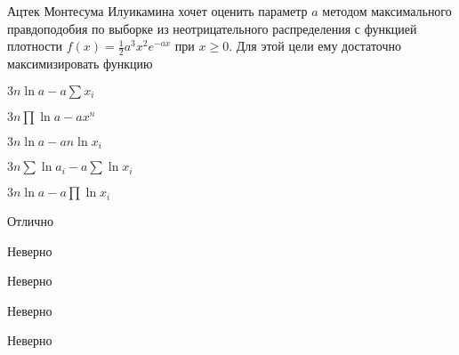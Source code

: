 
\begin{question}
Ацтек Монтесума Илуикамина хочет оценить параметр \(a\) методом
максимального правдоподобия по выборке из неотрицательного распределения
с функцией плотности \(f(x)=\frac{1}{2}a^3x^2e^{-ax}\) при \(x\geq 0\).
Для этой цели ему достаточно максимизировать функцию
\begin{answerlist}
  \item \(3n \ln a - a \sum x_i\)
  \item \(3n\prod \ln a - a x^n\)
  \item \(3n \ln a - an \ln x_i\)
  \item \(3n \sum \ln a_i - a \sum \ln x_i\)
  \item \(3n\ln a - a \prod \ln x_i\)
\end{answerlist}
\end{question}

\begin{solution}
\begin{answerlist}
  \item Отлично
  \item Неверно
  \item Неверно
  \item Неверно
  \item Неверно
\end{answerlist}
\end{solution}

